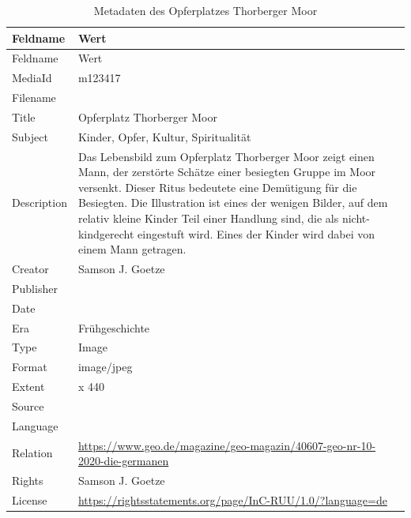 \documentclass[
  nswissgerman,
  letterpaper,
  DIV=11,
  numbers=noendperiod]{scrartcl}
\begin{document}
\begin{longtable}[]{@{}
  >{\raggedright\arraybackslash}p{}
  >{\raggedright\arraybackslash}p{}@{}}
\caption{Metadaten des Opferplatzes Thorberger
Moor}\label{tbl-metadaten-opferplatz-thorberger-moor}\tabularnewline
\toprule\noalign{}
\begin{minipage}[b]{\linewidth}\raggedright
Feldname
\end{minipage} & \begin{minipage}[b]{\linewidth}\raggedright
Wert
\end{minipage} \\
\midrule\noalign{}
\endfirsthead
\toprule\noalign{}
\begin{minipage}[b]{\linewidth}\raggedright
Feldname
\end{minipage} & \begin{minipage}[b]{\linewidth}\raggedright
Wert
\end{minipage} \\
\midrule\noalign{}
\endhead
\bottomrule\noalign{}
\endlastfoot
MediaId & m123417 \\
Filename & \\
Title & Opferplatz Thorberger Moor \\
Subject & Kinder, Opfer, Kultur, Spiritualität \\
Description & Das Lebensbild zum Opferplatz Thorberger Moor zeigt einen
Mann, der zerstörte Schätze einer besiegten Gruppe im Moor versenkt.
Dieser Ritus bedeutete eine Demütigung für die Besiegten. Die
Illustration ist eines der wenigen Bilder, auf dem relativ kleine Kinder
Teil einer Handlung sind, die als nicht-kindgerecht eingestuft wird.
Eines der Kinder wird dabei von einem Mann getragen. \\
Creator & Samson J. Goetze \\
Publisher & \\
Date & 2020 \\
Era & Frühgeschichte \\
Type & Image \\
Format & image/jpeg \\
Extent & 996 x 440 \\
Source & \\
Language & \\
Relation &
\url{https://www.geo.de/magazine/geo-magazin/40607-geo-nr-10-2020-die-germanen} \\
Rights & Samson J. Goetze \\
License &
\url{https://rightsstatements.org/page/InC-RUU/1.0/?language=de} \\
\end{longtable}
\end{document}
